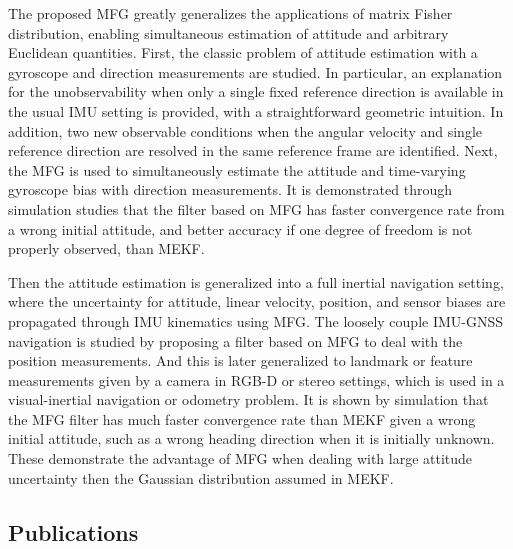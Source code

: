 The proposed MFG greatly generalizes the applications of matrix Fisher distribution, enabling simultaneous estimation of attitude and arbitrary Euclidean quantities.
First, the classic problem of attitude estimation with a gyroscope and direction measurements are studied.
In particular, an explanation for the unobservability when only a single fixed reference direction is available in the usual IMU setting is provided, with a straightforward geometric intuition.
In addition, two new observable conditions when the angular velocity and single reference direction are resolved in the same reference frame are identified.
Next, the MFG is used to simultaneously estimate the attitude and time-varying gyroscope bias with direction measurements.
It is demonstrated through simulation studies that the filter based on MFG has faster convergence rate from a wrong initial attitude, and better accuracy if one degree of freedom is not properly observed, than MEKF.

Then the attitude estimation is generalized into a full inertial navigation setting, where the uncertainty for attitude, linear velocity, position, and sensor biases are propagated through IMU kinematics using MFG.
The loosely couple IMU-GNSS navigation is studied by proposing a filter based on MFG to deal with the position measurements.
And this is later generalized to landmark or feature measurements given by a camera in RGB-D or stereo settings, which is used in a visual-inertial navigation or odometry problem.
It is shown by simulation that the MFG filter has much faster convergence rate than MEKF given a wrong initial attitude, such as a wrong heading direction when it is initially unknown.
These demonstrate the advantage of MFG when dealing with large attitude uncertainty then the Gaussian distribution assumed in MEKF.

\subsection{Publications}

